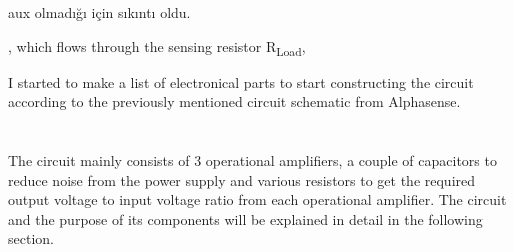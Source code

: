 aux olmadığı için sıkıntı oldu.   

, which flows through the sensing resistor R\textsubscript{Load}, 




I started to make a list of electronical parts to start constructing the circuit according to the previously mentioned circuit schematic from Alphasense. 


\section{}
The circuit mainly consists of 3 operational amplifiers, a couple of capacitors to reduce noise from the power supply and various resistors to get the required output voltage to input voltage ratio from each operational amplifier. The circuit and the purpose of its components will be explained in detail in the following section. 


